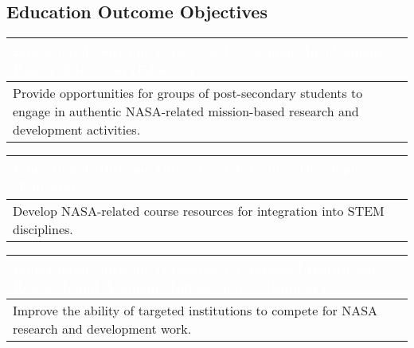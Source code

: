 \documentclass[nocover]            %
{CSLI}                       %
\begin{document}
\subsection{Education Outcome Objectives}

\begin{table}[H]
\centering
\begin{tabular}{| p{\textwidth} |}
\arrayrulecolor{white}
\hline
\rowcolor{gray!80}
\textcolor{white}{\textbf{Educational Outcome Objective 1.3: Student Involvement, Higher Education (Educate) }} \\ \hline
\rowcolor{gray!10}
Provide opportunities for groups of post-secondary students to engage in authentic NASA-related mission-based research and development activities.\\ \hline
\end{tabular}
\end{table}

\begin{table}[H]
\centering
\begin{tabular}{| p{\textwidth} |}
\arrayrulecolor{white}
\hline
\rowcolor{gray!80}
\textcolor{white}{\textbf{Educational Outcome Objective 1.4: Course Development (Educate)}} \\ \hline
\rowcolor{gray!10}
Develop NASA-related course resources for integration into STEM disciplines.\\ \hline
\end{tabular}
\end{table}

\begin{table}[H]
\centering
\begin{tabular}{| p{\textwidth} |}
\arrayrulecolor{white}
\hline
\rowcolor{gray!80}
\textcolor{white}{\textbf{Educational Outcome Objective 1.5 Targeted Institution Research and Academic Infrastructure (Employ)}} \\ \hline
\rowcolor{gray!10}
Improve the ability of targeted institutions to compete for NASA research and development work.\\ \hline
\end{tabular}
\end{table}
\end{document}
